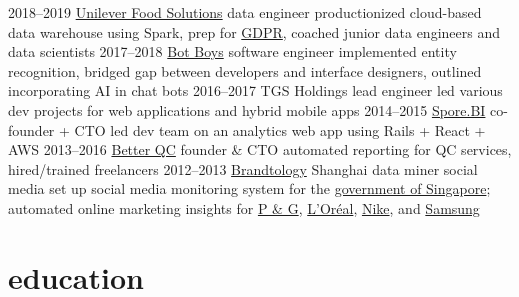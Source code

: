 \documentclass[]{friggeri-cv}
\begin{document}
\begin{entrylist}
\entry
    {2018–2019}
    {\href{https://www.unileverfoodsolutions.com/}{Unilever Food Solutions}}
    {data engineer}
    {
      productionized cloud-based data warehouse using Spark, prep for \href{https://www.eugdpr.org/}{GDPR}, coached junior data engineers and data scientists
    }
\entry
    {2017–2018}
    {\href{https://www.botboys.com/en/welcome/}{Bot Boys}}
    {software engineer}
    {implemented entity recognition, bridged gap between developers and interface designers, outlined incorporating AI in chat bots}
\entry
    {2016–2017}
    {TGS Holdings}
    {lead engineer}
    {led various dev projects for web applications and hybrid mobile apps}
\entry
    {2014–2015}
    {\href{http://sporebi.com/}{Spore.BI}}
    {co-founder + CTO}
    {led dev team on an analytics web app using Rails + React + AWS}
\entry
    {2013–2016}
    {\href{http://betterqc.com/}{Better QC}}
    {founder \& CTO}
    {automated reporting for QC services, hired/trained freelancers} %
\entry
    {2012–2013}
    {\href{http://www.isentia.com.sg/services/brandtology-social-media}{Brandtology} Shanghai}
    {data miner social media}
    {
      set up social media monitoring system for the \href{https://www.gov.sg/}{government of Singapore}; automated online marketing insights for
      \href{https://www.pg.com/}{P \& G},
      \href{http://www.loreal.com/}{L'Oréal},
      \href{https://www.nike.com/}{Nike},
      and
      \href{http://samsung.com/}{Samsung}
    }
\end{entrylist}

\section{education}
\end{document}
